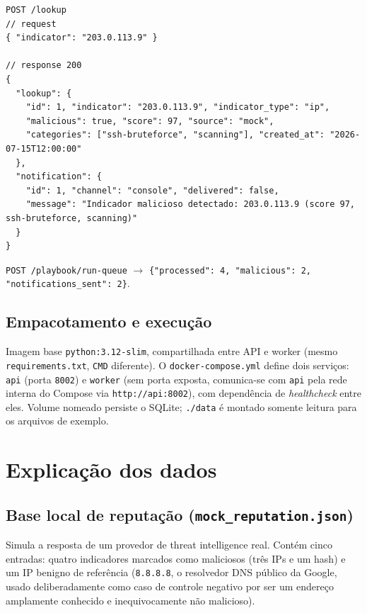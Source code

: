 \documentclass[11pt,a4paper]{article}
\begin{document}
\begin{lstlisting}
POST /lookup
// request
{ "indicator": "203.0.113.9" }

// response 200
{
  "lookup": {
    "id": 1, "indicator": "203.0.113.9", "indicator_type": "ip",
    "malicious": true, "score": 97, "source": "mock",
    "categories": ["ssh-bruteforce", "scanning"], "created_at": "2026-07-15T12:00:00"
  },
  "notification": {
    "id": 1, "channel": "console", "delivered": false,
    "message": "Indicador malicioso detectado: 203.0.113.9 (score 97, ssh-bruteforce, scanning)"
  }
}
\end{lstlisting}

\texttt{POST /playbook/run-queue} $\rightarrow$
\texttt{\{"processed": 4, "malicious": 2, "notifications\_sent": 2\}}.

\subsection{Empacotamento e execução}

Imagem base \texttt{python:3.12-slim}, compartilhada entre API e worker (mesmo
\texttt{requirements.txt}, \texttt{CMD} diferente). O \texttt{docker-compose.yml}
define dois serviços: \texttt{api} (porta \texttt{8002}) e \texttt{worker} (sem porta
exposta, comunica-se com \texttt{api} pela rede interna do Compose via
\texttt{http://api:8002}), com dependência de \emph{healthcheck} entre eles. Volume
nomeado persiste o SQLite; \texttt{./data} é montado somente leitura para os arquivos
de exemplo.

\section{Explicação dos dados}

\subsection{Base local de reputação (\texttt{mock\_reputation.json})}

Simula a resposta de um provedor de threat intelligence real. Contém cinco entradas:
quatro indicadores marcados como maliciosos (três IPs e um hash) e um IP benigno de
referência (\texttt{8.8.8.8}, o resolvedor DNS público da Google, usado deliberadamente
como caso de controle negativo por ser um endereço amplamente conhecido e
inequivocamente não malicioso).
\end{document}
